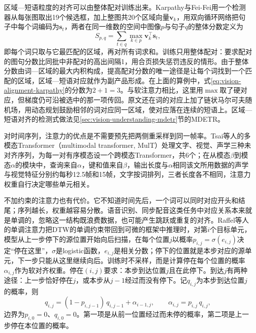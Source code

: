 区域—短语粒度的对齐可以由整体配对训练出来。Karpathy与Fei-Fei用一个检测器从每张图取出19个候选框，加上整图共20个区域向量$\bm v_k$，用双向循环网络把句子中每个词编码为$\bm s_t$，两者在同一维数的空间中图像$p$与句子$q$的整体分数定义为
\begin{equation}
  S_{p,q}=\sum_{t\in q}\max_{k\in p}\bm v_k^\top\bm s_t,
  \label{eq:vision-alignment-karpathy}
\end{equation}
即每个词只取与它最匹配的区域，再对所有词求和。训练只用整体配对：要求配对的图句分数比同批中非配对的高出间隔1，用合页损失惩罚违反的情形。由于整体分数由词—区域的最大内积构成，提高配对分数的唯一途径是让每个词找到一个匹配的区域，区域—短语对应就作为副产品形成。在上面的算例中，式\eqref{eq:vision-alignment-karpathy}的分数为$2+1=3$。与软注意力相比，这里用$\max$取了硬对应，但梯度仍可沿被选中的那一项传回。原文还在词的对应上加了链状马尔可夫随机场，用动态规划鼓励相邻的词对应同一区域，使对应落在连续的短语上。区域—短语对齐的检测式做法见\ref{sec:vision-understanding-mdetr}节的MDETR。

对时间序列，注意力的优点是不需要预先把两侧重采样到同一帧率。Tsai等人的多模态Transformer（multimodal transformer, MulT）处理文字、视觉、声学三种未对齐序列，为每一对有序模态设一个跨模态Transformer，共6个；在从模态$\beta$到模态$\alpha$的模块中，查询来自$\alpha$，键和值来自$\beta$，输出长度与$\alpha$相同该文所用数据的声学与视觉特征分别约每秒12.5帧和15帧，文字按词排列，三者长度各不相同，注意力权重自行决定哪些单元相关。

不加约束的注意力也有代价。它不知道时间先后，一个词可以同时对应开头和结尾；序列越长，权重越容易分散。语音识别、同步配音这类任务中对应关系本来就是单调的，忽略这一结构既浪费数据，也可能产生跳跃或重复的对齐。Raffel等人的单调注意力把DTW的单调约束带回到可微的框架中推理时，对第$i$个目标单元，模型从上一步停下的源位置开始向后扫描，在每个位置$j$以概率$p_{i,j}=\sigma(e_{i,j})$决定“停在这里”，$\sigma$是logistic函数，$e_{i,j}$是相关分数；停下的位置就是本步对应的源单元，下一步只能从这里继续向后。训练时不采样，而是计算停在每个位置的概率$\alpha_{i,j}$作为软对齐权重。停在$(i,j)$要求：本步到达位置$j$且在此停下。到达$j$有两种途径：上一步恰好停在$j$，或本步从$j-1$经过而没有停下。记$q_{i,j}$为本步到达位置$j$的概率，则
\begin{equation}
  q_{i,j}=(1-p_{i,j-1})\,q_{i,j-1}+\alpha_{i-1,j},\qquad
  \alpha_{i,j}=p_{i,j}\,q_{i,j},
  \label{eq:vision-alignment-monotonic}
\end{equation}
边界为$p_{i,0}=0$、$q_{i,0}=0$。第一项是从前一位置经过而未停的概率，第二项是上一步停在本位置的概率。

